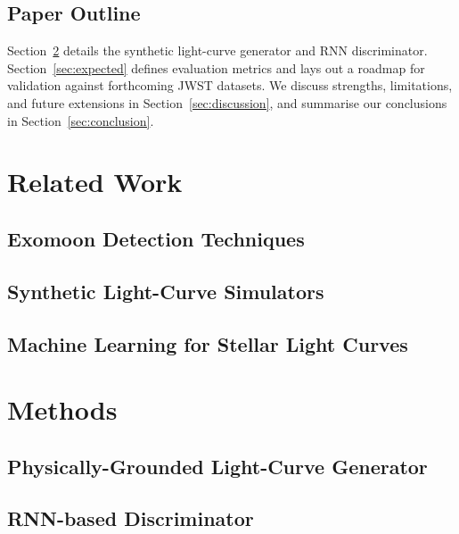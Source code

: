 \documentclass[11pt]{article}
\begin{document}
\subsection{Paper Outline}
Section~\ref{sec:methods} details the synthetic light-curve generator and RNN discriminator.  Section~\ref{sec:expected} defines evaluation metrics and lays out a roadmap for validation against forthcoming JWST datasets.  We discuss strengths, limitations, and future extensions in Section~\ref{sec:discussion}, and summarise our conclusions in Section~\ref{sec:conclusion}.

\section{Related Work}
\label{sec:related}
\subsection{Exomoon Detection Techniques}

\subsection{Synthetic Light-Curve Simulators}

\subsection{Machine Learning for Stellar Light Curves}

\section{Methods}
\label{sec:methods}

\subsection{Physically-Grounded Light-Curve Generator}
\label{sec:generator}

\subsection{RNN-based Discriminator}
\label{sec:discriminator}
\end{document}
